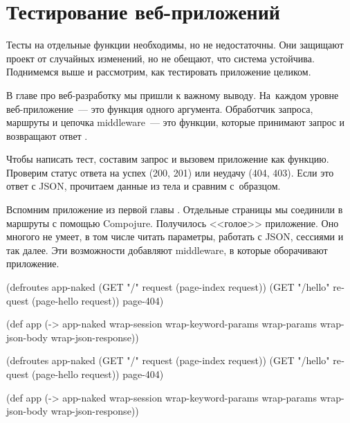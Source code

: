 \section{Тестирование веб-приложе\-ний}


Тесты на отдельные функции необходимы, но не недостаточны. Они защищают проект от
случайных изменений, но не обещают, что система устойчива. Поднимемся выше и
рассмотрим, как тестировать приложение целиком.

В главе про веб-разработку мы пришли к важному выводу. На~каждом уровне
веб-приложение~--- это функция одного аргумента. Обработчик запроса, маршруты и
цепочка middleware~--- это функции, которые принимают запрос и возвращают
ответ .

Чтобы написать тест, составим запрос и вызовем приложение как функцию. Проверим
статус ответа на успех (200, 201) или неудачу (404, 403). Если это ответ с JSON,
прочитаем данные из тела и сравним с~образцом.

Вспомним приложение из первой главы . Отдельные страницы мы
соединили в маршруты с помощью Compojure. Получилось <<голое>> приложение. Оно
многого не умеет, в том числе читать параметры, работать с JSON, сессиями и так
далее. Эти возможности добавляют middleware, в которые оборачивают приложение.


\ifx\DEVICETYPE\MOBILE

\begin{english}
  \begin{clojure}
(defroutes app-naked
  (GET "/"
    request (page-index request))
  (GET "/hello"
    request (page-hello request))
  page-404)

(def app
  (-> app-naked
      wrap-session
      wrap-keyword-params
      wrap-params
      wrap-json-body
      wrap-json-response))
  \end{clojure}
\end{english}

\else

\begin{english}
  \begin{clojure}
(defroutes app-naked
  (GET "/"      request (page-index request))
  (GET "/hello" request (page-hello request))
  page-404)

(def app
  (-> app-naked
      wrap-session
      wrap-keyword-params
      wrap-params
      wrap-json-body
      wrap-json-response))
  \end{clojure}
\end{english}


